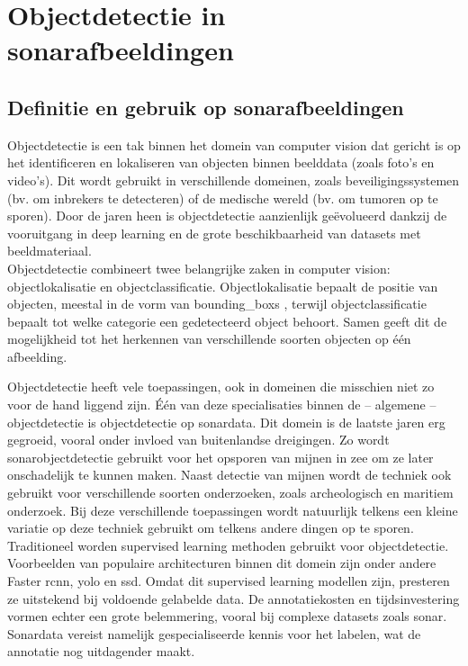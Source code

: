 \section{Objectdetectie in sonarafbeeldingen}

\subsection{Definitie en gebruik op sonarafbeeldingen}
\label{subsec:definitie-en-gebruik-op-sonarafbeeldingen}

Objectdetectie is een tak binnen het domein van computer vision dat gericht is op het identificeren en lokaliseren van objecten binnen beelddata (zoals foto's en video's). Dit wordt gebruikt in verschillende domeinen, zoals beveiligingssystemen (bv. om inbrekers te detecteren) of de medische wereld (bv. om tumoren op te sporen). Door de jaren heen is objectdetectie aanzienlijk geëvolueerd dankzij de vooruitgang in deep learning en de grote beschikbaarheid van datasets met beeldmateriaal. \autocite{He_2016} \\

Objectdetectie combineert twee belangrijke zaken in computer vision: objectlokalisatie en objectclassificatie. Objectlokalisatie bepaalt de positie van objecten, meestal in de vorm van \glspl{bounding_box} \autocite{Tompson_2015}, terwijl objectclassificatie bepaalt tot welke categorie een gedetecteerd object behoort. Samen geeft dit de mogelijkheid tot het herkennen van verschillende soorten objecten op één afbeelding.

Objectdetectie heeft vele toepassingen, ook in domeinen die misschien niet zo voor de hand liggend zijn. Één van deze specialisaties binnen de -- algemene -- objectdetectie is objectdetectie op sonardata. Dit domein is de laatste jaren erg gegroeid, vooral onder invloed van buitenlandse dreigingen. Zo wordt sonarobjectdetectie gebruikt voor het opsporen van mijnen in zee om ze later onschadelijk te kunnen maken. Naast detectie van mijnen wordt de techniek ook gebruikt voor verschillende soorten onderzoeken, zoals archeologisch en maritiem onderzoek. Bij deze verschillende toepassingen wordt natuurlijk telkens een kleine variatie op deze techniek gebruikt om telkens andere dingen op te sporen. \autocite{Wang_2024} \\

Traditioneel worden supervised learning methoden gebruikt voor objectdetectie. Voorbeelden van populaire architecturen binnen dit domein zijn onder andere Faster \gls{rcnn}, \gls{yolo} en \gls{ssd}. \autocite{Redmon_2016} Omdat dit supervised learning modellen zijn, presteren ze uitstekend bij voldoende gelabelde data. De annotatiekosten en tijdsinvestering vormen echter een grote belemmering, vooral bij complexe datasets zoals sonar. Sonardata vereist namelijk gespecialiseerde kennis voor het labelen, wat de annotatie nog uitdagender maakt. \autocite{Long_2015} \\

